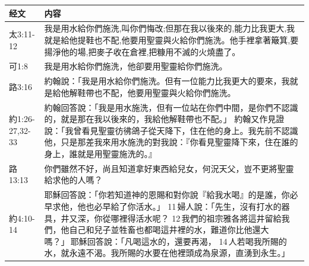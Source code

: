 \begin{table}[H]
\centering
\begin{tabular}{p{4em}|p{44em}}  \toprule
经文&内容 \\  \midrule

太3:11-12&我是用水給你們施洗,叫你們悔改;但那在我以後來的,能力比我更大,我就是給他提鞋也不配,他要用聖靈與火給你們施洗。他手裡拿著簸箕,要揚淨他的場,把麥子收在倉裡,把糠用不滅的火燒盡了。\\  \midrule
可1:8&我是用水給你們施洗，他卻要用聖靈給你們施洗。 \\  \midrule
路3:16&約翰說：「我是用水給你們施洗。但有一位能力比我更大的要來，我就是給他解鞋帶也不配，他要用聖靈與火給你們施洗。 \\  \midrule
約1:26-27,32-33&約翰回答說：「我是用水施洗，但有一位站在你們中間，是你們不認識的，就是那在我以後來的，我給他解鞋帶也不配。」
約翰又作見證說：「我曾看見聖靈彷彿鴿子從天降下，住在他的身上。我先前不認識他，只是那差我來用水施洗的對我說：『你看見聖靈降下來，住在誰的身上，誰就是用聖靈施洗的。』 \\  \midrule





路13:13&你們雖然不好，尚且知道拿好東西給兒女，何況天父，豈不更將聖靈給求他的人嗎？ \\  \midrule

約4:10-14&耶穌回答說：「你若知道神的恩賜和對你說『給我水喝』的是誰，你必早求他，他也必早給了你活水。」 11 婦人說：「先生，沒有打水的器具，井又深，你從哪裡得活水呢？ 12 我們的祖宗雅各將這井留給我們，他自己和兒子並牲畜也都喝這井裡的水，難道你比他還大嗎？」 耶穌回答說：「凡喝這水的，還要再渴， 14 人若喝我所賜的水，就永遠不渴。我所賜的水要在他裡頭成為泉源，直湧到永生。」 \\  \midrule


\end{tabular}
\end{table}
